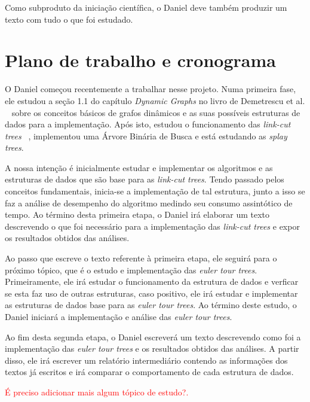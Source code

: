 \documentclass[12pt]{article}
\begin{document}
Como subproduto da iniciação científica, o Daniel deve também produzir
um texto com tudo o que foi estudado. 

\section{Plano de trabalho e cronograma}



O Daniel começou recentemente a trabalhar nesse projeto. Numa primeira
fase, ele estudou a seção 1.1 do capítulo \emph{Dynamic Graphs} no livro de Demetrescu et al. ~\cite{DemetrescuFI2004} sobre os conceitos básicos de grafos dinâmicos e as suas possíveis estruturas de dados para a implementação. 
Após isto, estudou o funcionamento das \emph{link-cut trees} ~\cite{DemaineHJSI2012}, implementou uma Árvore Binária de Busca e está estudando as \emph{splay trees}.

A nossa intenção é
inicialmente estudar e implementar os algoritmos e as estruturas de dados que são base para as \emph{link-cut trees}. 
Tendo passado pelos conceitos fundamentais, inicia-se a implementação de tal estrutura, junto a isso se faz a análise de desempenho do algoritmo medindo seu consumo assintótico de tempo.
Ao término desta primeira etapa, o Daniel irá elaborar um texto descrevendo o que foi necessário para a implementação das \emph{link-cut trees} e expor os resultados obtidos das análises.

Ao passo que escreve o texto referente à primeira etapa, ele seguirá para o próximo tópico, que é o estudo e implementação das \emph{euler tour trees}. Primeiramente, ele irá estudar o funcionamento da estrutura de dados e verficar se esta faz uso de outras estruturas, caso positivo, ele irá estudar e implementar as estruturas de dados base para as \emph{euler tour trees}. Ao término deste estudo, o Daniel iniciará a implementação e análise das \emph{euler tour trees}. 

Ao fim desta segunda etapa, o Daniel escreverá um texto descrevendo como foi a implementação das \emph{euler tour trees} e os resultados obtidos das análises. A partir disso, ele irá escrever um relatório intermediário contendo as informações dos textos já escritos e irá comparar o comportamento de cada estrutura de dados.

\textcolor{red}{É preciso adicionar mais algum tópico de estudo?.}
\end{document}
